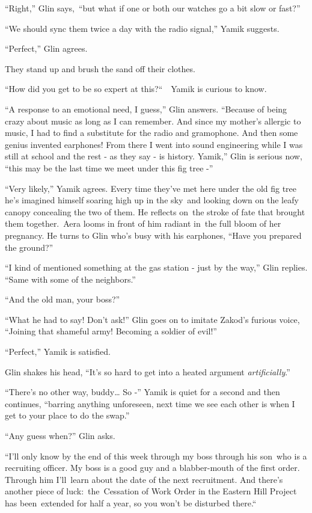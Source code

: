 \documentclass[twoside,11pt]{book}
\begin{document}
``Right,'' Glin says,\ ``but what if one or both our watches go a bit slow or
fast?'' 

``We should sync them twice a day with the radio signal,'' Yamik suggests. 

``Perfect,'' Glin agrees.

They stand up and brush the sand off their clothes. 

``How did you get to be so expert at this?``\ \ Yamik is curious to know.

``A response to an emotional need, I guess,'' Glin answers. ``Because of being
crazy about music as long as I can remember. And since my mother's allergic to music, I had to find a substitute for
the radio and gramophone. And then some genius invented earphones! From there I went into sound engineering while I was
still at school and the rest - as they say - is history. Yamik,'' Glin is serious now, ``this
may be the last time we meet under this fig tree -''

``Very likely,'' Yamik agrees. Every time they've met here under the old fig tree he's
imagined himself soaring high up in the sky~and looking down on the leafy canopy concealing the two of them. He
reflects on~the stroke of fate that brought them together.\  Aera looms in front of him radiant in~the full bloom of
her pregnancy. He turns to Glin who's busy with his earphones, ``Have you prepared the
ground?''

``I kind of mentioned something at the gas station - just by the way,'' Glin replies.
``Same with some of the neighbors.'' 

``And the old man, your boss?'' 

``What he had to say! Don't ask!'' Glin goes on to imitate Zakod's furious voice,
``Joining that shameful army! Becoming a soldier of evil!'' 

``Perfect,'' Yamik is satisfied. 

Glin shakes his head, ``It's so hard to get into a heated argument \textit{artificially}.'' 

``There's no other way, buddy{\dots} So -'' Yamik is quiet for a second and then continues,
``barring anything unforeseen, next time we see each other is when I get to your place to do the
swap.'' 

``Any guess when?'' Glin asks. 

``I'll only know by the end of this week through my boss through his son\ who is a recruiting officer. My
boss is a good guy and a blabber-mouth of the first order. Through him I'll\ learn about the date of the next
recruitment. And there's another piece of luck:\ the\ Cessation of Work Order in the Eastern Hill Project has
been~extended for half a year, so you won't be disturbed there.``\ 
\end{document}
